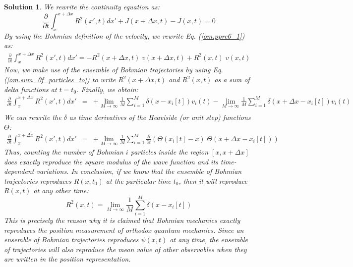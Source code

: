 \documentclass[onecolumn,nofootinbib, secnumarabic, amsmath, nobibnotes,12pt,aps,pra]{revtex4-1}
\newtheorem{solution}{Solution}
\newcommand{\eref}[1]{Eq. (\ref{#1})}
\begin{document}
\begin{solution}
We rewrite the continuity equation as:
\begin{equation}
\frac {\partial} {\partial t} \int_{x}^{x + \Delta x} R^2(x',t) dx' + J(x + \Delta x,t) - J(x,t) = 0
\label{om.ppre6_1}
\end{equation}
By using the Bohmian definition of the velocity, we rewrite \eref{om.ppre6_1} as:
\begin{eqnarray}
\frac {\partial} {\partial t} \int_{x}^{x + \Delta x} R^2(x',t) dx' = - { R^2(x + \Delta x,t) \; v(x + \Delta x,t) + R^2(x,t) \; v(x,t)}
\label{om.ppre6_2}
\end{eqnarray}
Now, we make use of the ensemble of Bohmian trajectories by using
\eref{om.sum_0f_particles_to} to write $R^2(x + \Delta x,t)$ and
$R^2(x,t)$ as a sum of delta functions at $t = t_0$. Finally, we
obtain:
\begin{eqnarray}
\frac {\partial} {\partial t} \int_{x}^{x + \Delta x} R^2(x',t) dx' &=&
+ \lim_{M\rightarrow\infty} \frac {1} {M} \sum_{i = 1}^{M} \delta(x - x_i[t]) v_i(t) -\lim_{M\rightarrow\infty} \frac {1} {M} \sum_{i = 1}^{M} \delta(x + \Delta x - x_i[t]) v_i(t)\nonumber\\
\label{om.ppre6_3}
\end{eqnarray}
We can rewrite the $\delta$ as time derivatives of the Heaviside (or
unit step) functions $\Theta$:
\begin{eqnarray}
\frac {\partial} {\partial t} \int_{x}^{x + \Delta x} R^2(x',t) dx' &=&
+ \lim_{M\rightarrow\infty} \frac {1} {M} \sum_{i = 1}^{M} \frac {\partial} {\partial t} \left( \Theta(x_i[t] - x) \; \Theta (x + \Delta x - x_i[t]) \right)\quad\qquad
\label{om.ppre6_4}
\end{eqnarray}
Thus, counting the number of Bohmian $i$ particles inside the region
$[x,x + \Delta x]$ does exactly reproduce the square modulus of the
wave function and its time-dependent variations. In conclusion, if
we know that the ensemble of Bohmian trajectories reproduces
$R(x,t_0)$ at the particular time $t_0$, then it will reproduce
$R(x,t)$ at any other time:
\begin{equation}
R^2(x,t) = \lim_{M\rightarrow\infty} \frac {1} {M}  \sum_{i = 1}^{M} \delta(x - x_i[t])
\end{equation}
This is precisely the reason why it is claimed that Bohmian mechanics exactly reproduces the position measurement of orthodox quantum mechanics. Since an ensemble of Bohmian trajectories reproduces $\psi(x,t)$ at any time, the ensemble of trajectories will also reproduce the mean value of other observables when they are written in the position representation.\\
\end{solution}
\end{document}
